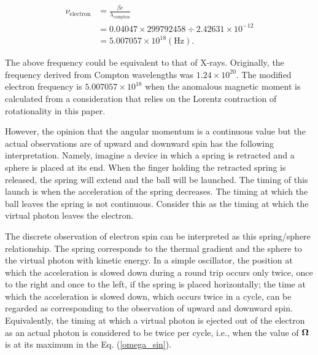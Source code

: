 \documentclass[10.5pt]{article}
\numberwithin{equation}{section}
\begin{document}
    \begin{equation}
        \begin{split}
            \nu_{\mathrm{electron}} 
                &= \frac{\beta c}{\lambda_{\mathrm{compton}}}  \\
                &= 0.04047 \times 299792458 \div 2.42631\times10^{-12} \\
                &= 5.007057 \times 10^{18} \mathrm{(Hz)}
                .
        \label{nu_electron}
        \end{split}
    \end{equation}


 The above frequency could be equivalent to that of X-rays. Originally, the frequency derived from Compton wavelengths was $1.24\times10^{20}$. The modified electron frequency is $5.007057\times10^{18}$ when the anomalous magnetic moment is calculated from a consideration that relies on the Lorentz contraction of rotationality in this paper.




However, the opinion that the angular momentum is a continuous value but the actual observations are of upward and downward spin has the following interpretation. Namely, imagine a device in which a spring is retracted and a sphere is placed at its end. When the finger holding the retracted spring is released, the spring will extend and the ball will be launched. The timing of this launch is when the acceleration of the spring decreases. The timing at which the ball leaves the spring is not continuous. Consider this as the timing at which the virtual photon leaves the electron.

The discrete observation of electron spin can be interpreted as this spring/sphere relationship. The spring corresponds to the thermal gradient and the sphere to the virtual photon with kinetic energy. In a simple oscillator, the position at which the acceleration is slowed down during a round trip occurs only twice, once to the right and once to the left, if the spring is placed horizontally; the time at which the acceleration is slowed down, which occurs twice in a cycle, can be regarded as corresponding to the observation of upward and downward spin. Equivalently, the timing at which a virtual photon is ejected out of the electron as an actual photon is considered to be twice per cycle, i.e., when the value of ${\bf \Omega}$ is at its maximum in the Eq. (\ref{omega_sin}).
\end{document}
